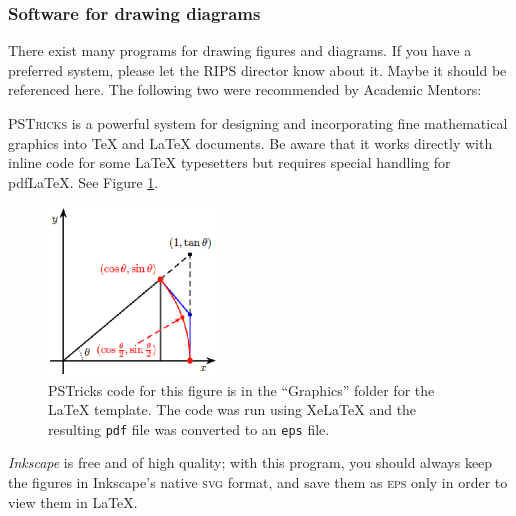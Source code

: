 {\subsubsection{Software for drawing diagrams}

There exist many programs for drawing figures and diagrams.
If you have a preferred system, please let the RIPS director know about it.
Maybe it should be referenced here.
The following two were recommended by Academic Mentors:

\textsc{PSTricks} is a powerful system for designing and incorporating fine mathematical graphics into {\TeX} and {\LaTeX} documents.
Be aware that it works directly with inline code for some {\LaTeX} typesetters but  requires special handling for pdf{\LaTeX}.  
See Figure \ref{FIGURE:fromPSTricks}.


\begin{figure}[h]
\begin{center}
\includegraphics[clip, width=0.4\textwidth]{Graphics/SineTheta5-CS.eps}
\caption[A sample figure created as an \texttt{eps} file by \textsc{Matlab}]{PSTricks code for this figure is in the ``Graphics'' folder for the {\LaTeX} template.
The code was run using Xe{\LaTeX} and the resulting \texttt{pdf} file was converted to an \texttt{eps} file.}\label{FIGURE:fromPSTricks}
\end{center}
\end{figure}


\emph{Inkscape} is free and of high quality;
with this program, you should always keep the figures in Inkscape's native \textsc{svg} format,
and save them as \textsc{eps} only in order to view them in {\LaTeX}.


}

